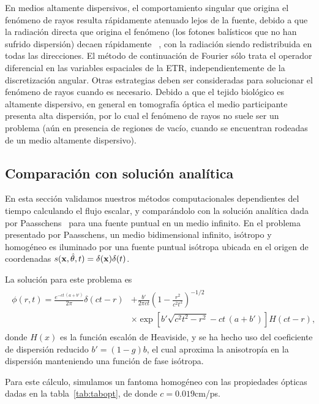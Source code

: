 En medios altamente dispersivos, el comportamiento singular 
que origina el fenómeno de rayos resulta rápidamente atenuado lejos 
de la fuente, debido a que la radiación directa que origina el fenómeno 
(los fotones balísticos que no han sufrido dispersión) decaen rápidamente
~\cite{Ramankutty1997}, con la radiación siendo redistribuida en todas las 
direcciones. El método de continuación de Fourier sólo trata 
el operador diferencial en las variables espaciales de la ETR, independientemente 
de la discretización angular. Otras estrategias deben ser consideradas 
para solucionar el fenómeno de rayos cuando es necesario. Debido 
a que el tejido biológico es altamente dispersivo, en general 
en tomografía óptica el medio participante presenta alta dispersión, 
por lo cual el fenómeno de rayos no suele ser un problema (aún 
en presencia de regiones de vacío, cuando se encuentran rodeadas de un 
medio altamente dispersivo).

\subsection{Comparación con solución analítica}

En esta sección validamos nuestros métodos computacionales 
dependientes del tiempo calculando el flujo escalar, 
y comparándolo con la solución analítica dada por Paasschens~\cite{Paasschens1997} 
para una fuente puntual en un medio infinito. 
En el problema presentado por Paasschens, un medio bidimensional infinito, 
isótropo y homogéneo es iluminado por una fuente puntual isótropa
ubicada en el origen de coordenadas $s(\mathbf{x},\hat{\theta},t)=\delta(\mathbf{x})\delta(t)$.

La solución para este problema es
\begin{equation}
\begin{split}
\begin{aligned}
\phi(r,t)=\frac{e^{-c t \, (a+b')}}{2\pi}\delta(ct-r)&+\frac{b'}{2\pi c t}\left(1-\frac{r^2}{c^2t^2}\right)^{-1/2}\\
&\times\exp\left[b'\sqrt{c^2t^2-r^2}-c t \, (a+b')\right]H(ct-r),
\end{aligned}
\end{split}
\label{eq:Paasschenssc}
\end{equation}
donde $H(x)$ es la función escalón de Heaviside, 
y se ha hecho uso del coeficiente de dispersión reducido $b'=(1-g)b$, 
el cual aproxima la anisotropía en la dispersión manteniendo una 
función de fase isótropa.

Para este cálculo, simulamos un fantoma homogéneo con las propiedades ópticas 
dadas en la tabla~\ref{tab:tabopt}, de donde $c=0.019$cm/ps.

